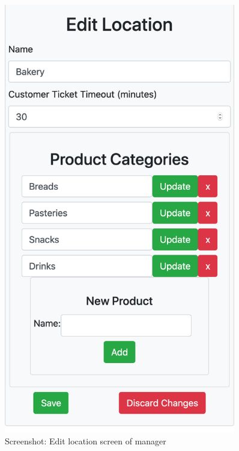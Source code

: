 \begin{figure}[H]
    \centering
    \begin{minipage}{0.45\textwidth}
        \centering
        \includegraphics[width=0.9\textwidth]{Images/Screenshots/editLocation.png}
        \caption{Screenshot: Edit location screen of manager}
    \end{minipage}\hfill
    \begin{minipage}{0.45\textwidth}
        \centering

\end{minipage}
\end{figure}
